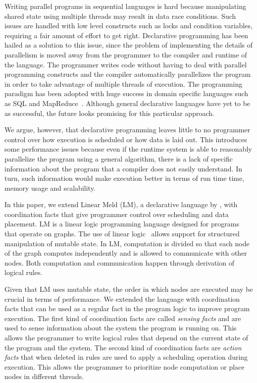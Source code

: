 
Writing parallel programs in sequential languages is hard because manipulating
shared state using multiple threads may result in data race
conditions. Such issues are handled with low level constructs such as locks and
condition variables, requiring a fair amount of effort to get right.
Declarative programming has been hailed as a solution to this issue, since the
problem of implementing the details of parallelism is moved away from the programmer to the
compiler and runtime of the language. The programmer writes code
without having to deal with parallel programming constructs and the compiler
automatically parallelizes the program in order to take advantage of
multiple threads of execution.
The programming paradigm has been adopted with huge success in domain specific
languages such as SQL and MapReduce~\cite{Dean:2008:MSD:1327452.1327492}.
Although general declarative languages have yet to be as successful, the
future looks promising for this particular approach.

We argue, however, that declarative programming leaves little to no programmer control
over how execution is scheduled or how data is laid out. This introduces some
performance issues because even if the runtime system is able to reasonably
parallelize the program using a general algorithm, there is a lack of specific
information about the program that a compiler does not easily understand. In
turn, such information would make execution better in terms of run time time,
memory usage and scalability.

In this paper, we extend Linear Meld (LM), a declarative language by
\cite{cruz-iclp14,cruz-ppdp14}, with coordination facts that give programmer
control over scheduling and data placement. LM is a linear logic programming
language designed for programs that operate on graphs.  The use of linear
logic~\cite{girard-87} allows support for structured manipulation of mutable
state. In LM, computation is divided so that each node of the graph computes
independently and is allowed to communicate with other nodes.
Both computation and communication happen through derivation of logical rules.

Given that LM uses mutable state, the order in which nodes are executed may be
crucial in terms of performance. We extended the language with coordination
facts that can be used as a regular fact in the program logic to improve program
execution.  The first kind of coordination facts are called \emph{sensing facts}
and are used to sense information about the system the program is running on.
This allows the programmer to write logical rules that depend on the current
state of the program and the system. The second kind of coordination facts are
\emph{action facts} that when deleted in rules are used to apply a scheduling
operation during execution. This allows the programmer to prioritize node
computation or place nodes in different threads.


